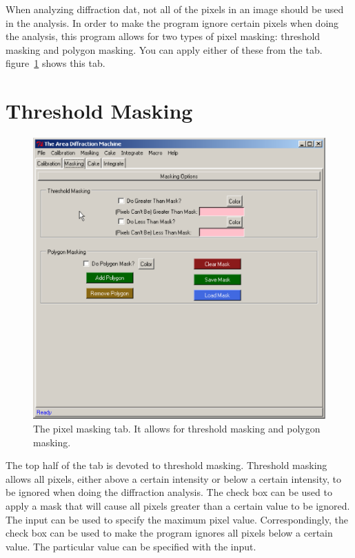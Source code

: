 When analyzing diffraction dat, not all of the pixels in 
an image should be used in the analysis. In order to make 
the program
ignore certain pixels when doing the analysis, this
program allows for two types of pixel masking:
threshold masking and polygon masking. You can 
apply either of these from the 
 tab. figure~\ref{masking_tab}
shows this tab. 

\section{Threshold Masking}

\begin{figure}
    \centering
    \includegraphics[scale=.75]{figures/masking_tab.eps}
    \caption{The pixel masking tab. It allows for threshold 
    masking and polygon masking.} 
    \label{masking_tab}
\end{figure}

The top half of the  tab is devoted to 
threshold masking. Threshold masking allows all pixels, 
either above a certain intensity or below a certain 
intensity, to be ignored when doing the diffraction 
analysis. The  check box can 
be used to apply a mask that will cause all pixels 
greater than a certain value to be ignored.
The  input 
can be used to specify the maximum pixel value.
Correspondingly, the  check box
can be used to make the program ignores all
pixels below a certain value. The particular value can 
be specified with the  input. 

